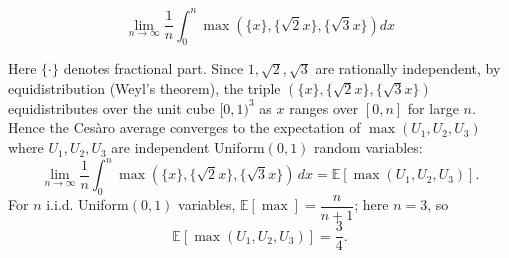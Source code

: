 \begin{questions}
\question
\[ \lim_{n\to\infty} \frac{1}{n}\int_0^n \max\left(\{x\},\{\sqrt2 x\},\{\sqrt3 x\}\right) dx \]
\begin{solution}
Here $\{\cdot\}$ denotes fractional part. Since $1,\sqrt2,\sqrt3$ are rationally independent, by equidistribution (Weyl's theorem), the triple $(\{x\},\{\sqrt2x\},\{\sqrt3x\})$ equidistributes over the unit cube $[0,1)^3$ as $x$ ranges over $[0,n]$ for large $n$. Hence the Cesàro average converges to the expectation of $\max(U_1,U_2,U_3)$ where $U_1,U_2,U_3$ are independent Uniform$(0,1)$ random variables:
\[ \lim_{n\to\infty}\frac1n\int_0^n \max(\{x\},\{\sqrt2x\},\{\sqrt3x\})\,dx = \mathbb{E}[\max(U_1,U_2,U_3)]. \]
For $n$ i.i.d. Uniform$(0,1)$ variables, $\mathbb{E}[\max] = \dfrac{n}{n+1}$; here $n=3$, so
\[ \mathbb{E}[\max(U_1,U_2,U_3)] = \frac{3}{4}. \]
\end{solution}

\end{questions}

